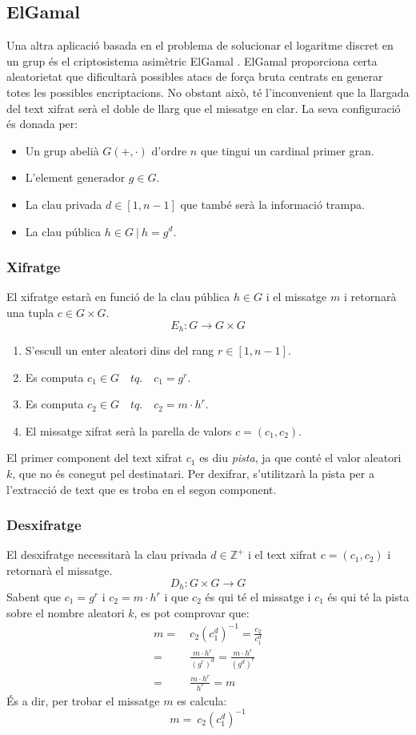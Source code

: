 \documentclass{article}
\begin{document}
\subsection{ElGamal}
Una altra aplicació basada en el problema de solucionar el logaritme discret en un grup és el criptosistema asimètric ElGamal \cite{elgamal}. ElGamal proporciona certa aleatorietat que dificultarà possibles atacs de força bruta centrats en generar totes les possibles encriptacions. No obstant això, té l'inconvenient que la llargada del text xifrat serà el doble de llarg que el missatge en clar. La seva configuració és donada per:
\begin{itemize}
	\item Un grup abelià $G(+, \cdot)$ d'ordre $n$ que tingui un cardinal primer gran. 
	\item L'element generador $g \in G$.
	\item La clau privada $d \in [1, n-1]$ que també serà la informació trampa.
	\item La clau pública $h \in G \ | \ h = g^d$.
\end{itemize}
\subsubsection{Xifratge}
El xifratge estarà en funció de la clau pública $h \in G$ i el missatge $m$ i retornarà una tupla $c \in G \times G$.
\[ E_h : G \rightarrow G \times G \]
\begin{enumerate}
	\item S'escull un enter aleatori dins del rang $r \in [1, n-1]$.
	\item Es computa $c_1 \in G \quad tq. \quad c_1 = g^r$.
	\item Es computa $c_2 \in G \quad tq. \quad c_2 = m \cdot h^r$.
	\item El missatge xifrat serà la parella de valors $c = (c_1, c_2)$.
\end{enumerate}
El primer component del text xifrat $c_1$ es diu \textit{pista}, ja que conté el valor aleatori $k$, que no és conegut pel destinatari. Per dexifrar, s'utilitzarà la pista per a l'extracció de text que es troba en el segon component.
\subsubsection{Desxifratge}
El desxifratge necessitarà la clau privada $d \in \mathbb{Z^+}$ i el text xifrat $c = (c_1, c_2)$ i retornarà el missatge.
\[D_h : G \times G \rightarrow G \] 
Sabent que $c_1 = g^r$ i $c_2 = m \cdot h^r$ i que $c_2$ és qui té el missatge i $c_1$ és qui té la pista sobre el nombre aleatori $k$, es pot comprovar que:
\begin{equation*}
	\begin{aligned}
		m =& \ c_2 (c_1^d)^{-1}	= \frac{c_2}{c_1^d}	\\
		=& \ \frac{m \cdot h^r}{(g^r)^d} = \frac{m \cdot h^r}{(g^d)^r}\\
		=& \ \frac{m \cdot h^r}{h^r} = m
	\end{aligned}
\end{equation*}
És a dir, per trobar el missatge $m$ es calcula:
\[ m = \ c_2 (c_1^d)^{-1} \]
\end{document}
